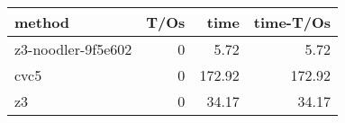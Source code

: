 \begin{tabular}{lrrr}
\hline
 method             &   T/Os &   time &   time-T/Os \\
\hline
 z3-noodler-9f5e602 &      0 &   5.72 &        5.72 \\
 cvc5               &      0 & 172.92 &      172.92 \\
 z3                 &      0 &  34.17 &       34.17 \\
\hline
\end{tabular}
